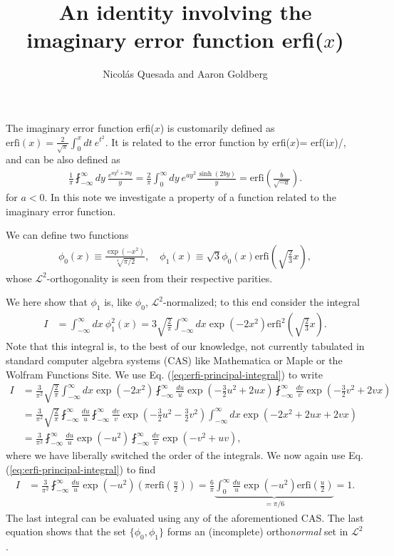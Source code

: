 \documentclass[11pt,letterpaper]{article}
\title{An identity involving the imaginary error function erfi($x$)}
\author{Nicol\'as Quesada and Aaron Goldberg}
\date{}
\newcommand{\eq}[1]{\begin{align}#1\end{align}}
\newcommand{\erfi}{\text{erfi}}
\newcommand{\iu}{\text{i}}
\begin{document}
\maketitle
The imaginary error function erfi($x$) is customarily defined as $\erfi(x) = \frac{2}{\sqrt{\pi}} \int_0^x dt \ e^{t^2}$.
It is related to the error function by erfi($x$)= erf($\iu x$)/\iu, and can be also defined as
\eq{
\frac{1}{\pi} \fint_{-\infty}^{\infty} dy\ \frac{e^{a y^2 +2 b y}}{ y} = \frac{2}{\pi}\int_0^\infty dy \ e^{a y^2}\frac{\sinh(2 b y)}{ y}=\erfi\left(\frac{b}{\sqrt{-a}}\right).
\label{eq:erfi-principal-integral}
}
for $a<0$. In this note we investigate a property of a function related to the imaginary error function.

We can define two functions
\eq{
  \phi_0(x)\equiv\frac{\exp\left(-x^2\right)}{\sqrt[4]{\pi/2}}, 
\quad   \phi_1(x)\equiv\sqrt{3}\phi_0\left(x\right)\erfi\left(\sqrt{\frac{2}{3}}x\right),
}
whose $\mathcal{L}^2$-orthogonality is seen from their respective parities. 

We here show that $\phi_1$ is, like $\phi_0$, $\mathcal{L}^2$-normalized; to this end consider the integral
\eq{
  I&=\int_{-\infty}^\infty dx \ \phi_1^2\left(x\right) =3\sqrt{\frac{2}{\pi}}\int_{-\infty}^\infty dx  \exp\left(-2x^2\right)\erfi^2\left(\sqrt{\frac{2}{3}}x\right).
}
Note that this integral is, to the best of our knowledge, not currently tabulated in standard computer algebra systems (CAS) like Mathematica or Maple or the Wolfram Functions Site. 
We use Eq. (\ref{eq:erfi-principal-integral}) to write
\begin{subequations}
\eq{
  I&=\frac{3}{\pi^2}\sqrt{\frac{2}{\pi}}\int_{-\infty}^\infty dx\exp\left(-2x^2\right)\fint_{-\infty}^\infty \frac{du}{u} \exp\left(-\frac{3}{2}u^2+2ux\right)\fint_{-\infty}^\infty \frac{dv}{v} \exp\left(-\frac{3}{2}v^2+2vx\right)\\
  &=\frac{3}{\pi^2}\sqrt{\frac{2}{\pi}}\fint_{-\infty}^\infty \frac{du}{u}\fint_{-\infty}^\infty \frac{dv}{v}
  \exp\left(-\frac{3}{2}u^2-\frac{3}{2}v^2\right) \int_{-\infty}^\infty dx \exp\left(-2x^2+2ux+2vx\right)\\
  &=\frac{3}{\pi^2}\fint_{-\infty}^\infty \frac{du}{u}\exp\left(-u^2\right)\fint_{-\infty}^\infty \frac{dv}{v}
  \exp\left(-v^2+uv\right),
}
\end{subequations}
where we have liberally switched the order of the integrals. We now again use Eq. (\ref{eq:erfi-principal-integral}) to find
\eq{
  I&=\frac{3}{\pi^2}\fint_{-\infty}^\infty \frac{du}{u}\exp\left(-u^2\right)\left(\pi\erfi\left(\frac{u}{2}\right)\right)=\frac{6}{\pi}\underbrace{\int_{0}^\infty \frac{du}{u}\exp\left(-u^2\right)\erfi\left(\frac{u}{2}\right)}_{=\pi/6}=1.
}
The last integral can be evaluated using any of the aforementioned CAS. The last equation shows that the set $\{\phi_0,\phi_1 \}$ forms an (incomplete) ortho\emph{normal} set in $\mathcal{L}^2$.
\end{document}
